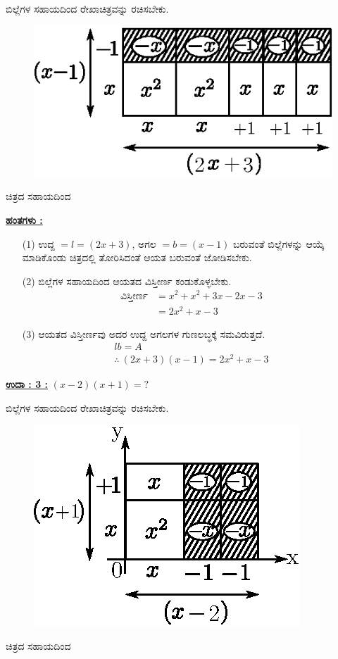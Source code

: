 ಬಿಲ್ಲೆಗಳ ಸಹಾಯದಿಂದ ರೇಖಾಚಿತ್ರವನ್ನು ರಚಿಸಬೇಕು.
\begin{figure}[H]
\centering
\includegraphics[scale=0.9]{src/figure/chap3/fig3-31b.eps}
\end{figure}
ಚಿತ್ರದ ಸಹಾಯದಿಂದ 

\noindent
{\textbf{\underline{ಹಂತಗಳು :}}}

\begin{itemize}
\item [(1)] ಉದ್ದ $= l = (2x + 3)$, ಅಗಲ $= b = (x - 1)$ ಬರುವಂತೆ ಬಿಲ್ಲೆಗಳನ್ನು ಆಯ್ಕೆ ಮಾಡಿಕೊಂಡು ಚಿತ್ರದಲ್ಲಿ ತೋರಿಸಿದಂತೆ ಆಯತ ಬರುವಂತೆ ಜೋಡಿಸ\break ಬೇಕು. 
\item [(2)] ಬಿಲ್ಲೆಗಳ ಸಹಾಯದಿಂದ ಆಯತದ ವಿಸ್ತೀರ್ಣ ಕಂಡುಕೊಳ್ಳಬೇಕು.
\begin{align*}
\text{ವಿಸ್ತೀರ್ಣ} & = x^2 + x^2 + 3x - 2x - 3\\
& = 2x^2 + x - 3
\end{align*}
\item [(3)] ಆಯತದ ವಿಸ್ತೀರ್ಣವು ಅದರ ಉದ್ದ ಅಗಲಗಳ ಗುಣಲಬ್ಧಕ್ಕೆ ಸಮವಿರುತ್ತದೆ.
\begin{gather*}
lb = A\\
\therefore~ (2x + 3)(x - 1) = 2x^2 + x - 3
\end{gather*}
\end{itemize}

\noindent
{\textbf{\underline{ಉದಾ : 3 :}}} $(x - 2)(x + 1) = ?$

ಬಿಲ್ಲೆಗಳ ಸಹಾಯದಿಂದ ರೇಖಾಚಿತ್ರವನ್ನು ರಚಿಸಬೇಕು.
\begin{figure}[H]
\centering
\includegraphics[scale=0.8]{src/figure/chap3/fig3-31c.eps}
\end{figure}
ಚಿತ್ರದ ಸಹಾಯದಿಂದ 

